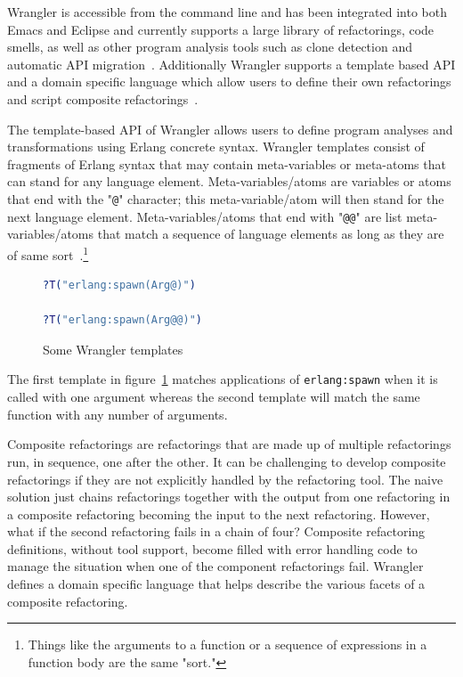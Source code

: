 Wrangler is accessible from the command line and has been integrated into both Emacs and Eclipse and currently supports a large library of refactorings, code smells, as well as other program analysis tools such as clone detection and automatic API migration~\citep{wrangler}. Additionally Wrangler supports a template based API and a domain specific language which allow users to define their own refactorings and script composite refactorings~\citep{wranglerDomain}.

The template-based API of Wrangler allows users to define program analyses and transformations using Erlang concrete syntax. Wrangler templates consist of fragments of Erlang syntax that may contain meta-variables or meta-atoms that can stand for any language element. Meta-variables/atoms are variables or atoms that end with the "\texttt{@}" character; this meta-variable/atom will then stand for the next language element. Meta-variables/atoms that end with "\texttt{@@}" are list meta-variables/atoms that match a sequence of language elements as long as they are of same sort~\citep{letsUser}.\footnote{Things like the arguments to a function or a sequence of expressions in a function body are the same "sort."}

\begin{figure}[t]
\begin{lstlisting}[language=erlang]
?T("erlang:spawn(Arg@)")

?T("erlang:spawn(Arg@@)")
\end{lstlisting}
\caption{Some Wrangler templates}
\label{templates}
\end{figure}

The first template in figure~\ref{templates} matches applications of \texttt{erlang:spawn} when it is called with one argument whereas the second template will match the same function with any number of arguments.

Composite refactorings are refactorings that are made up of multiple refactorings run, in sequence, one after the other. It can be challenging to develop composite refactorings if they are not explicitly handled by the refactoring tool. The naive solution just chains refactorings together with the output from one refactoring in a composite refactoring becoming the input to the next refactoring. However, what if the second refactoring fails in a chain of four? Composite refactoring definitions, without tool support, become filled with error handling code to manage the situation when one of the component refactorings fail. Wrangler defines a domain specific language that helps describe the various facets of a composite refactoring.

